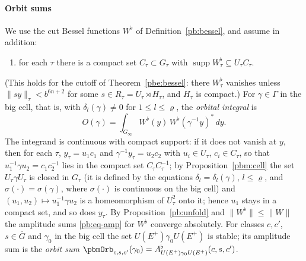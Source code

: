 \documentclass[10pt]{amsart}
\theoremstyle{definition}
\theoremstyle{remark}
\providecommand{\auG}{\overline G}
\begin{document}
\paragraph*{Orbit sums}
We use the cut Bessel functions $W^\flat$ of Definition~\ref{pb:bessel}, and assume in addition:
\begin{enumerate}
\item[(B5$'$)] for each $\tau$ there is a compact set $C_\tau\subset G_\tau$ with $\operatorname{supp}
W_\tau^\flat\subseteq U_\tau C_\tau$.
\end{enumerate}
(This holds for the cutoff of Theorem~\ref{pbe:bessel}: there $W^\flat_\tau$ vanishes unless
$\|sy\|_\tau<b^{6n+2}$ for some $s\in R_\tau=U_\tau\rtimes H_\tau$, and $H_\tau$ is compact.) For
$\gamma\in\Gamma$ in the big cell, that is, with $\delta_l(\gamma)\ne0$ for $1\le l\le\varrho$, the
\emph{orbital integral} is
\[
O(\gamma)=\int_{G_\infty}W^\flat(y)\,W^\flat(\gamma^{-1}y)^*\,dy .
\]
The integrand is continuous with compact support: if it does not vanish at $y$, then for each
$\tau$, $y_\tau=u_1c_1$ and $\gamma^{-1}y_\tau=u_2c_2$ with $u_i\in U_\tau$, $c_i\in C_\tau$, so that
$u_1^{-1}\gamma u_2=c_1c_2^{-1}$ lies in the compact set $C_\tau C_\tau^{-1}$; by
Proposition~\ref{pbm:cell} the set $U_\tau\gamma U_\tau$ is closed in $G_\tau$ (it is defined by
the equations $\delta_l=\delta_l(\gamma)$, $l\le\varrho$, and $\sigma(\cdot)=\sigma(\gamma)$, where
$\sigma(\cdot)$ is continuous on the big cell) and $(u_1,u_2)\mapsto u_1^{-1}\gamma u_2$ is a
homeomorphism of $U_\tau^2$ onto it; hence $u_1$ stays in a compact set, and so does $y_\tau$. By
Proposition~\ref{pb:unfold} and $\|W^\flat\|\le\|W\|$ the amplitude sums \eqref{pb:eq-amp} for
$W^\flat$ converge absolutely. For classes
$c,c'$, $s\in\auG$ and $\gamma_0$ in the big cell the set $U(E^+)\gamma_0U(E^+)$ is stable; its amplitude sum is the \emph{orbit sum}
$\pbmOrb_{c,s,c'}(\gamma_0)=A^\flat_{U(E^+)\gamma_0U(E^+)}(c,s,c')$.
\end{document}
